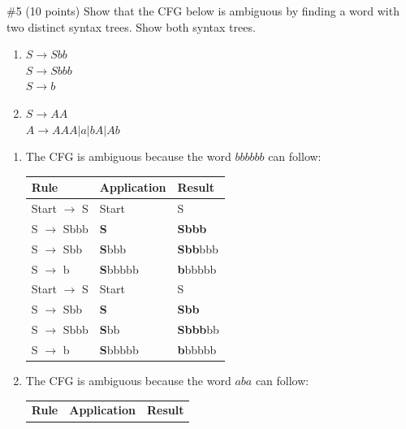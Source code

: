 \begin{problem}{\#5 (10 points)}
    Show that the CFG below is ambiguous by finding a word with two distinct syntax trees.
    Show both syntax trees.
    \begin{enumerate}[label=\alph*)]
        \item $S \to Sbb$\\
        $S \to Sbbb$\\
        $S \to b$\\
        \item $S \to AA$\\
        $A \to AAA|a|bA|Ab$
    \end{enumerate}
\end{problem}
\begin{solution}
    \begin{enumerate}
        \item The CFG is ambiguous because the word $bbbbbb$ can follow:\\
        \begin{table}[h]
            \centering\begin{tabular}{l|l|l}
                \textbf{Rule} & \textbf{Application} & \textbf{Result}\\
                \hline
                Start $\to$ S & Start & S\\
                S $\to$ Sbbb & \textbf{S} & \textbf{Sbbb}\\
                S $\to$ Sbb & \textbf{S}bbb & \textbf{Sbb}bbb\\
                S $\to$ b & \textbf{S}bbbbb & \textbf{b}bbbbb\\
                \hline
                Start $\to$ S & Start & S\\
                S $\to$ Sbb & \textbf{S} & \textbf{Sbb}\\
                S $\to$ Sbbb & \textbf{S}bb & \textbf{Sbbb}bb\\
                S $\to$ b & \textbf{S}bbbbb & \textbf{b}bbbbb
            \end{tabular}
            \label{tb:q5a}
        \end{table}
        \item The CFG is ambiguous because the word $aba$ can follow:\\
        \begin{table}[h]
            \centering\begin{tabular}{l|l|l}
                \textbf{Rule} & \textbf{Application} & \textbf{Result}\\

\end{tabular}
\end{table}
\end{enumerate}
\end{solution}
